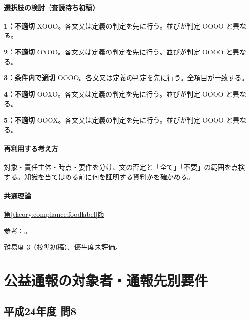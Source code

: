 \paragraph{選択肢の検討（査読待ち初稿）}\mbox{}\par

\noindent\textbf{1：不適切} XOOO。各文又は定義の判定を先に行う。並びが判定 OOOO と異なる。\par

\noindent\textbf{2：不適切} OXOO。各文又は定義の判定を先に行う。並びが判定 OOOO と異なる。\par

\noindent\textbf{3：条件内で適切} OOOO。各文又は定義の判定を先に行う。全項目が一致する。\par

\noindent\textbf{4：不適切} OOXO。各文又は定義の判定を先に行う。並びが判定 OOOO と異なる。\par

\noindent\textbf{5：不適切} OOOX。各文又は定義の判定を先に行う。並びが判定 OOOO と異なる。\par

\paragraph{再利用する考え方} 対象・責任主体・時点・要件を分け、文の否定と「全て」「不要」の範囲を点検する。知識を当てはめる前に何を証明する資料かを確かめる。

\paragraph{共通理論} \hyperref[theory:compliance:foodlabel]{第\ref*{theory:compliance:foodlabel}節}

\par 参考：\cite{saf53_food_notice,saf53_food_loss2013,saf53_food_expiry}。

\par 難易度 3（校準初稿）、優先度未評価。

\section{公益通報の対象者・通報先別要件}

\subsection{平成24年度 問8}
\label{q:h24-reg-apt-08}

